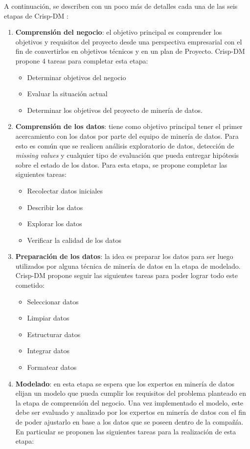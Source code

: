     A continuación, se describen con un poco más de detalles cada una de las seis etapas de Crisp-DM \cite{wirth2000crisp}:
\begin{enumerate}
    \item \textbf{Comprensión del negocio}: el objetivo principal es comprender los objetivos y requisitos del proyecto desde una perspectiva empresarial con el fin de convertirlos en objetivos técnicos y en un plan de Proyecto. Crisp-DM propone 4 tareas para completar esta etapa:
    \begin{itemize}
        \item Determinar objetivos del negocio
        \item Evaluar la situación actual
        \item Determinar los objetivos del proyecto de minería de datos.
    \end{itemize}
    \item \textbf{Comprensión de los datos}: tiene como objetivo principal tener el primer acercamiento con los datos por parte del equipo de minería de datos. Para esto es común que se realicen análisis exploratorio de datos, detección de \textit{missing values} y cualquier tipo de evaluación que pueda entregar hipótesis sobre el estado de los datos. Para esta etapa, se propone completar las siguientes tareas:
    \begin{itemize}
        \item Recolectar datos iniciales
        \item Describir los datos
        \item Explorar los datos
        \item Verificar la calidad de los datos
    \end{itemize}
    \item \textbf{Preparación de los datos}: la idea es preparar los datos para ser luego utilizados por alguna técnica de minería de datos en la etapa de modelado.  Crisp-DM propone seguir las siguientes tareas para poder lograr todo este cometido:
    \begin{itemize}
        \item Seleccionar datos
        \item Limpiar datos
        \item Estructurar datos
        \item Integrar datos
        \item Formatear datos
    \end{itemize}
    \item \textbf{Modelado}: en esta etapa se espera que los expertos en minería de datos elijan un modelo que pueda cumplir los requisitos del problema planteado en la etapa de comprensión del negocio. Una vez implementado el modelo, este debe ser evaluado y analizado por los expertos  en minería de datos con el fin de poder ajustarlo en base a los datos que se poseen dentro de la compañía. En particular se proponen las siguientes tareas para la realización de esta etapa:

\end{enumerate}
